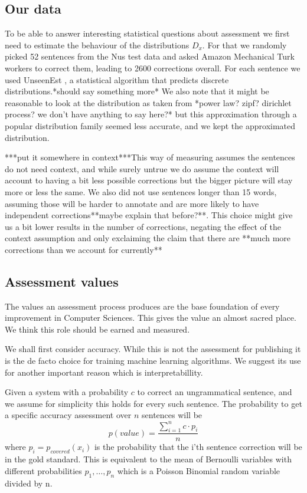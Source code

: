 \documentclass[english]{article}
\begin{document}
\subsection{Our data}
To be able to answer interesting statistical questions about assessment we first need to estimate the behaviour of the distributions $D_x$. For that we randomly picked 52 sentences from the Nus \cite{dahlmeier2013building} test data and asked Amazon Mechanical Turk workers to correct them, leading to 2600 corrections overall. For each sentence we used UnseenEst \cite{zou2015quantifying}, a statistical algorithm that predicts discrete distributions.{*}should say something more{*} We also note that it might be reasonable to look at the distribution as taken from {*}power law? zipf? dirichlet process? we don't have anything to say here?{*} but this approximation through a popular distribution family seemed less accurate, and we kept the approximated distribution.

{*}{*}{*}put it somewhere in context{*}{*}{*}This way of measuring
assumes the sentences do not need context, and while surely untrue
we do assume the context will account to having a bit less possible
corrections but the bigger picture will stay more or less the same.
We also did not use sentences longer than 15 words, assuming those
will be harder to annotate and are more likely to have independent
corrections{*}{*}maybe explain that before?{*}{*}. This choice might
give us a bit lower results in the number of corrections, negating
the effect of the context assumption and only exclaiming the claim
that there are {*}{*}much more corrections than we account for currently{*}{*}

\subsection{Assessment values}

The values an assessment process produces are the base foundation of
 every improvement in Computer Sciences. This gives the value an
  almost sacred place. We think this role should be earned and measured.
 
 We shall first consider accuracy. While this is not the assessment for publishing it is the de facto choice for training machine learning algorithms. We suggest its use for another important reason which is interpretabillity.

Given a system with a probability $c$ to correct an ungrammatical sentence, and we assume for simplicity this holds for every such sentence. The probability to get a specific accuracy assessment over $n$ sentences will be $$p\left(value\right)=\frac{\sum_{i=1}^{n}c\cdot p_i}{n} $$ 
where $p_i=p_{covered}\left(x_i\right) $ is the probability that the i'th sentence correction will be in the gold standard. This is equivalent to the mean of Bernoulli variables with different probabilities $p_1,\ldots,p_n$ which is a Poisson Binomial random variable divided by n. 
\end{document}
